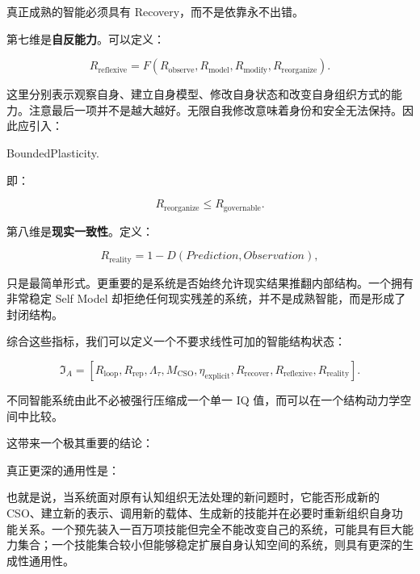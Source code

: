 真正成熟的智能必须具有 Recovery，而不是依靠永不出错。

第七维是\textbf{自反能力}。可以定义：

\[
R_{\mathrm{reflexive}}
=
F(
R_{\mathrm{observe}},
R_{\mathrm{model}},
R_{\mathrm{modify}},
R_{\mathrm{reorganize}}
).
\]

这里分别表示观察自身、建立自身模型、修改自身状态和改变自身组织方式的能力。注意最后一项并不是越大越好。无限自我修改意味着身份和安全无法保持。因此应引入：

\begin{statementbox}
BoundedPlasticity.
\end{statementbox}

即：

\[
R_{\mathrm{reorganize}}
\leq
R_{\mathrm{governable}}.
\]

第八维是\textbf{现实一致性}。定义：

\[
R_{\mathrm{reality}}
=
1
-
D(
Prediction,
Observation
),
\]

只是最简单形式。更重要的是系统是否始终允许现实结果推翻内部结构。一个拥有非常稳定 Self Model 却拒绝任何现实残差的系统，并不是成熟智能，而是形成了封闭结构。

综合这些指标，我们可以定义一个不要求线性可加的智能结构状态：

\[
\mathfrak I_A
=
\left[
R_{\mathrm{loop}},
R_{\mathrm{rep}},
\Lambda_\tau,
M_{\mathrm{CSO}},
\eta_{\mathrm{explicit}},
R_{\mathrm{recover}},
R_{\mathrm{reflexive}},
R_{\mathrm{reality}}
\right].
\]

不同智能系统由此不必被强行压缩成一个单一 IQ 值，而可以在一个结构动力学空间中比较。

这带来一个极其重要的结论：

\begin{statementbox}
\centering
{}
\end{statementbox}

真正更深的通用性是：

\begin{statementbox}
\centering
{}
\end{statementbox}

也就是说，当系统面对原有认知组织无法处理的新问题时，它能否形成新的 CSO、建立新的表示、调用新的载体、生成新的技能并在必要时重新组织自身功能关系。一个预先装入一百万项技能但完全不能改变自己的系统，可能具有巨大能力集合；一个技能集合较小但能够稳定扩展自身认知空间的系统，则具有更深的生成性通用性。

